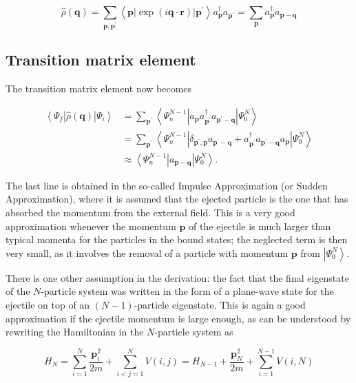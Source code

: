 {$$
\hat{\rho}(\boldsymbol{q})=\sum_{\boldsymbol{p}, \boldsymbol{p}^{\prime}}\left\langle\boldsymbol{p}|\exp (i \boldsymbol{q} \cdot \boldsymbol{r})| \boldsymbol{p}^{\prime}\right\rangle a_{\boldsymbol{p}}^{\dagger} a_{\boldsymbol{p}^{\prime}}=\sum_{\boldsymbol{p}} a_{\boldsymbol{p}}^{\dagger} a_{\boldsymbol{p}-\boldsymbol{q}}
$$


\subsection{Transition matrix element}

The transition matrix element now becomes

$$
\begin{aligned}
\left\langle\Psi_{f}|\hat{\rho}(\boldsymbol{q})| \Psi_{i}\right\rangle & =\sum_{\boldsymbol{p}^{\prime}}\left\langle\Psi_{n}^{N-1}\left|a_{\boldsymbol{p}} a_{\boldsymbol{p}^{\prime}}^{\dagger} a_{\boldsymbol{p}^{\prime}-\boldsymbol{q}}\right| \Psi_{0}^{N}\right\rangle \\
& =\sum_{\boldsymbol{p}^{\prime}}\left\langle\Psi_{n}^{N-1}\left|\delta_{\boldsymbol{p}^{\prime}, \boldsymbol{p}} a_{\boldsymbol{p}^{\prime}-\boldsymbol{q}}+a_{\boldsymbol{p}^{\prime}}^{\dagger} a_{\boldsymbol{p}^{\prime}-\boldsymbol{q}} a_{\boldsymbol{p}}\right| \Psi_{0}^{N}\right\rangle \\
& \approx\left\langle\Psi_{n}^{N-1}\left|a_{\boldsymbol{p}-\boldsymbol{q}}\right| \Psi_{0}^{N}\right\rangle .
\end{aligned}
$$

    
The last line is obtained in the so-called Impulse Approximation (or
Sudden Approximation), where it is assumed that the ejected particle
is the one that has absorbed the momentum from the external
field. This is a very good approximation whenever the momentum
$\boldsymbol{p}$ of the ejectile is much larger than typical momenta
for the particles in the bound states; the neglected term 
is then very small, as it involves the removal of a particle with
momentum $\boldsymbol{p}$ from $\left|\Psi_{0}^{N}\right\rangle$.

There is one other assumption in the derivation: the fact that the
final eigenstate of the $N$-particle system was written in the form of
a plane-wave state for the ejectile on top of an $(N-1)$-particle
eigenstate. This is again a good approximation if the ejectile
momentum is large enough, as can be understood by rewriting the
Hamiltonian in the $N$-particle system as

$$
H_{N}=\sum_{i=1}^{N} \frac{\boldsymbol{p}_{i}^{2}}{2 m}+\sum_{i<j=1}^{N} V(i, j)=H_{N-1}+\frac{\boldsymbol{p}_{N}^{2}}{2 m}+\sum_{i=1}^{N-1} V(i, N)
$$


}
